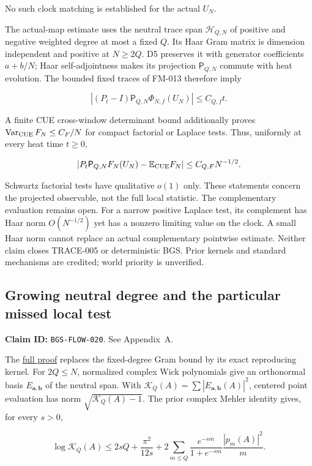No such
clock matching is established for the actual \(U_N\).

\begin{theorem}\label{pass2:frontier-flow-019}

The actual-map estimate uses the neutral trace span \(\mathcal H_{Q,N}\)
of positive and negative weighted degree at most a fixed \(Q\). Its Haar
Gram matrix is dimension independent and positive at \(N\ge2Q\).
D5 preserves it with generator coefficients \(a+b/N\); Haar self-adjointness
makes its projection \(\mathsf P_{Q,N}\) commute with heat evolution.
The bounded fixed traces of FM-013 therefore imply

\[
|(P_t-I)\mathsf P_{Q,N}\Phi_{N,f}(U_N)|\le C_{Q,f}t.
\]

A finite CUE cross-window determinant bound additionally proves
\(\operatorname{Var}_{\rm CUE}F_N\le C_F/N\) for compact factorial or
Laplace tests. Thus, uniformly at every heat time \(t\ge0\),

\[
|P_t\mathsf P_{Q,N}F_N(U_N)-\mathbb E_{\rm CUE}F_N|\le C_{Q,F}N^{-1/2}.
\]

\end{theorem}

Schwartz factorial tests have qualitative \(o(1)\) only. These statements
concern the projected observable, not the full local statistic.
The complementary evaluation remains open. For a narrow positive
Laplace test, its complement has Haar norm \(O(N^{-1/2})\) yet has a
nonzero limiting value on the clock. A small Haar norm cannot replace
an actual complementary pointwise estimate. Neither claim closes
TRACE-005 or deterministic BGS. Prior kernels and standard mechanisms
are credited; world priority is unverified.

\hypertarget{growing-neutral-degree-and-the-particular-missed-local-test}{%
\subsection{Growing neutral degree and the particular missed local test}\label{growing-neutral-degree-and-the-particular-missed-local-test}}

\textbf{Claim ID:} \texttt{BGS-FLOW-020}. See Appendix~A.

\begin{theorem}\label{pass2:frontier-flow020}

The
\href{https://github.com/ChurilovMaksim/BGS/blob/main/mathematics/growing_degree_trace_projection.md}{full proof} replaces the fixed-degree
Gram bound by its exact reproducing kernel. For \(2Q\le N\), normalized
complex Wick polynomials give an orthonormal basis \(E_{\boldsymbol a,\boldsymbol b}\)
of the neutral span. With
\(\mathcal K_Q(A)=\sum|E_{\boldsymbol a,\boldsymbol b}(A)|^2\),
centered point evaluation has norm \(\sqrt{\mathcal K_Q(A)-1}\).
The prior complex Mehler identity gives, for every \(s>0\),

\[
\log\mathcal K_Q(A)\le2sQ+\frac{\pi^2}{12s}
+2\sum_{m\le Q}\frac{e^{-sm}}{1+e^{-sm}}\frac{|p_m(A)|^2}{m}.
\]

\end{theorem}

